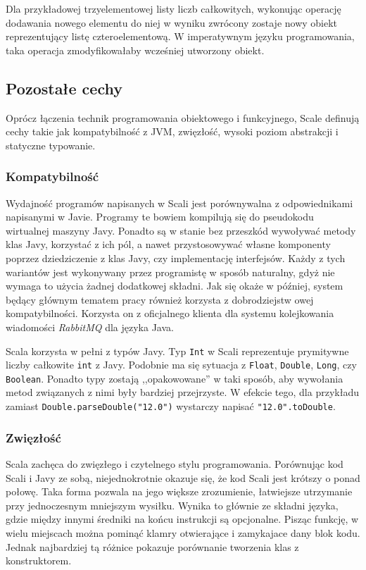 \documentclass[brudnopis]{xmgr}
\begin{document}
Dla przykładowej trzyelementowej listy liczb całkowitych, wykonując operację dodawania nowego elementu do niej w wyniku zwrócony zostaje nowy obiekt reprezentujący listę czteroelementową. W imperatywnym języku programowania, taka operacja zmodyfikowałaby wcześniej utworzony obiekt. 

\subsection{Pozostałe cechy}

Oprócz łączenia technik programowania obiektowego i funkcyjnego, Scale definują cechy takie jak kompatybilność z JVM, zwięzłość, wysoki poziom abstrakcji i statyczne typowanie. 

\subsubsection{Kompatybilność}

Wydajność programów napisanych w Scali jest porównywalna z odpowiednikami napisanymi w Javie. Programy te bowiem kompilują się do pseudokodu wirtualnej maszyny Javy. Ponadto są w stanie bez przeszkód wywoływać metody klas Javy, korzystać z ich pól, a nawet przystosowywać własne komponenty poprzez dziedziczenie z klas Javy, czy implementację interfejsów. Każdy z tych wariantów jest wykonywany przez programistę w sposób naturalny, gdyż nie wymaga to użycia żadnej dodatkowej składni. Jak się okaże w później, system będący głównym tematem pracy również korzysta z dobrodziejstw owej kompatybilności. Korzysta on z oficjalnego klienta dla systemu kolejkowania wiadomości \emph{RabbitMQ} dla języka Java.

Scala korzysta w pełni z typów Javy. Typ \texttt{Int} w Scali reprezentuje prymitywne liczby całkowite \texttt{int} z Javy. Podobnie ma się sytuacja z \texttt{Float}, \texttt{Double}, \texttt{Long}, czy \texttt{Boolean}. Ponadto typy zostają ,,opakowowane'' w taki sposób, aby wywołania metod związanych z nimi były bardziej przejrzyste. W efekcie tego, dla przykładu zamiast \texttt{Double.parseDouble("12.0")} wystarczy napisać \texttt{"12.0".toDouble}.

\subsubsection{Zwięzłość}

Scala zachęca do zwięzłego i czytelnego stylu programowania. Porównując kod Scali i Javy ze sobą, niejednokrotnie okazuje się, że kod Scali jest krótszy o ponad połowę. Taka forma pozwala na jego większe zrozumienie, łatwiejsze utrzymanie przy jednoczesnym mniejszym wysiłku. Wynika to głównie ze składni języka, gdzie między innymi średniki na końcu instrukcji są opcjonalne. Pisząc funkcję, w wielu miejscach można pominąć klamry otwierające i zamykajace dany blok kodu. Jednak najbardziej tą różnice pokazuje porównanie tworzenia klas z konstruktorem.
\end{document}
